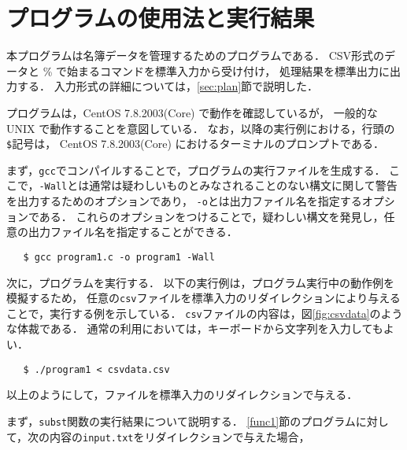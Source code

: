 \section{プログラムの使用法と実行結果}\label{sec:howresult}

本プログラムは名簿データを管理するためのプログラムである．
CSV形式のデータと \% で始まるコマンドを標準入力から受け付け，
処理結果を標準出力に出力する．
入力形式の詳細については，\ref{sec:plan}節で説明した．

プログラムは，CentOS 7.8.2003(Core) で動作を確認しているが，
一般的な UNIX で動作することを意図している．
なお，以降の実行例における，行頭の\verb|$|記号は，
CentOS 7.8.2003(Core) におけるターミナルのプロンプトである．

まず，\verb|gcc|でコンパイルすることで，プログラムの実行ファイルを生成する．
ここで，\verb|-Wall|とは通常は疑わしいものとみなされることのない構文に関して警告を出力するためのオプションであり，
\verb|-o|とは出力ファイル名を指定するオプションである．
これらのオプションをつけることで，疑わしい構文を発見し，任意の出力ファイル名を指定することができる．

{\fontsize{10pt}{11pt} \selectfont
 \begin{verbatim}
   $ gcc program1.c -o program1 -Wall
 \end{verbatim}
}

次に，プログラムを実行する．
以下の実行例は，プログラム実行中の動作例を模擬するため，
任意の\verb|csv|ファイルを標準入力のリダイレクションにより与えることで，実行する例を示している\cite{www:label1}．
\verb|csv|ファイルの内容は，図\ref{fig:csvdata}のような体裁である．
通常の利用においては，キーボードから文字列を入力してもよい．

{\fontsize{10pt}{11pt} \selectfont
 \begin{verbatim}
   $ ./program1 < csvdata.csv
 \end{verbatim}
}

以上のようにして，ファイルを標準入力のリダイレクションで与える．

まず，\verb|subst|関数の実行結果について説明する．
\ref{func1}節のプログラムに対して，次の内容の\verb|input.txt|をリダイレクションで与えた場合，

